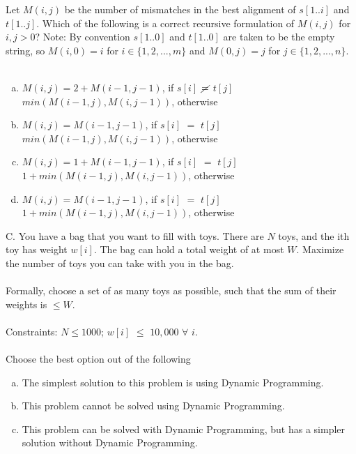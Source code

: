 \documentclass[12pt]{article}
\begin{document}
Let $M(i,j)$ be the number of mismatches in the best alignment of $s[1..i]$ 
and $t[1..j]$. Which of the following is a correct recursive formulation 
of $M(i,j)$ for $i,j > 0$? Note: By convention $s[1..0]$ and $t[1..0]$ are taken 
to be the empty string, so $M(i, 0) = i$ for $i \in \{1,2,...,m\}$ and $M(0,j) = j$ 
for $j \in \{1,2,...,n\}$.\\\\
\begin{enumerate}[a)]
    \item $M(i,j) = 2+M(i-1,j-1)$, if $s[i]$ $\cancel{=}$ $t[j]$\\
    $min(M(i-1,j),M(i,j-1))$, otherwise
    \item $M(i,j) = M(i-1,j-1)$, if $s[i]$ $=$ $t[j]$\\
    $min(M(i-1,j),M(i,j-1))$, otherwise
    \item $M(i,j) = 1+M(i-1,j-1)$, if $s[i]$ $=$ $t[j]$\\
    $1+min(M(i-1,j),M(i,j-1))$, otherwise
    \item $M(i,j) = M(i-1,j-1)$, if $s[i]$ $=$ $t[j]$\\
    $1+min(M(i-1,j),M(i,j-1))$, otherwise
\end{enumerate}
C. You have a bag that you want to fill with toys. 
There are $N$ toys, and the ith toy has weight $w[i]$. The bag 
can hold a total weight of at most $W$. Maximize the number 
of toys you can take with you in the bag.\\\\
Formally, choose a set of as many toys as possible, 
such that the sum of their weights is $\leq W$.\\\\
Constraints: $N \leq 1000$; $w[i]$ $\leq$ $10,000$ $\forall$ $i$.\\\\
Choose the best option out of the following
\begin{enumerate}[a)]
    \item The simplest solution to this problem is using Dynamic Programming.
    \item This problem cannot be solved using Dynamic Programming.
    \item This problem can be solved with Dynamic Programming, but has a simpler solution without Dynamic Programming.
\end{enumerate}
\end{document}
